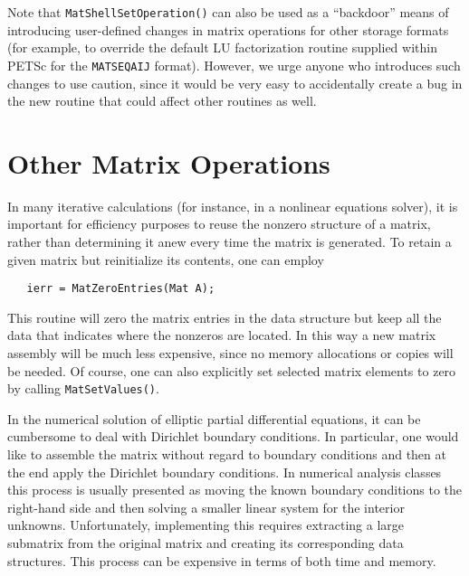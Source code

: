 Note that {\tt MatShellSetOperation()} can also be used as a
``backdoor'' means of introducing user-defined changes in matrix
operations for other storage formats (for example, to override the
default LU factorization routine supplied within PETSc for the
{\tt MATSEQAIJ} format).  However, we urge anyone who introduces such
changes to use caution, since it would be very easy to
accidentally create a bug in the new routine that could affect
other routines as well.

\section{Other Matrix Operations}
\label{sec:othermat}

In many iterative calculations (for instance, in a nonlinear equations
solver), it is important for efficiency purposes to reuse the nonzero 
structure of a matrix, rather than determining it anew every time 
the matrix is generated.  To retain a given matrix but reinitialize
its contents, one can employ 
\begin{verbatim}
   ierr = MatZeroEntries(Mat A);
\end{verbatim}
This routine will zero the matrix entries in the 
data structure but keep all the data that indicates where the nonzeros
are located.  In this way a new matrix assembly will be much less 
expensive, since no memory allocations or copies will be needed. 
Of course, one can also explicitly set selected matrix elements to zero
by calling {\tt MatSetValues()}.


In the numerical solution of elliptic partial differential equations,
it can be cumbersome to deal with Dirichlet boundary 
 conditions. In
particular, one would like to assemble the matrix without regard to 
boundary conditions and then at the end apply the Dirichlet boundary 
conditions. 
In numerical analysis classes this process is usually presented as moving the 
known boundary conditions to the right-hand side and then solving a smaller
linear system for the interior unknowns. Unfortunately, implementing this
requires extracting a large submatrix from the original matrix and 
creating its corresponding data structures. This process can be expensive 
in terms of both time and memory. 

